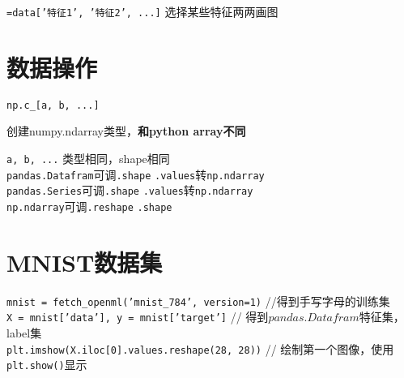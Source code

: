 \documentclass[UTF8]{ctexart}
\begin{document}
  \quad \texttt{=data['特征1', '特征2', ...]} 选择某些特征两两画图

\section{数据操作}
\noindent \texttt{np.c\_[a, b, ...]}

  创建numpy.ndarray类型，\textbf{和python array不同}

  \texttt{a, b, ...} 类型相同，shape相同\\
\texttt{pandas.Datafram}可调\texttt{.shape} \texttt{.values}转\texttt{np.ndarray}\\
\texttt{pandas.Series}可调\texttt{.shape} \texttt{.values}转\texttt{np.ndarray}\\
\texttt{np.ndarray}可调\texttt{.reshape} \texttt{.shape}

\section{MNIST数据集}
\noindent \texttt{mnist = fetch\_openml('mnist\_784', version=1)} //得到手写字母的训练集\\
\texttt{X = mnist['data'], y = mnist['target']} // 得到$pandas.Datafram$特征集，label集\\
\texttt{plt.imshow(X.iloc[0].values.reshape(28, 28))} // 绘制第一个图像，使用\texttt{plt.show()}显示\\
\end{document}

